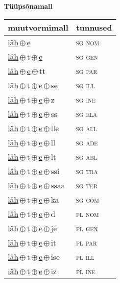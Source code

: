 

\vspace{3.5em}
\noindent \begin{minipage}{\textwidth}
\noindent \textbf{Tüüpsõnamall \,}\\

\begin{sideways}
\begin{tabular}{l l}
muutvormimall & tunnused \\
\hline
\underline{läh}\,$\oplus$\,\underline{e} & \textsc{ sg nom } \\
\underline{läh}\,$\oplus$\,t\,$\oplus$\,\underline{e} & \textsc{ sg gen } \\
\underline{läh}\,$\oplus$\,\underline{e}\,$\oplus$\,tt & \textsc{ sg par } \\
\underline{läh}\,$\oplus$\,t\,$\oplus$\,\underline{e}\,$\oplus$\,se & \textsc{ sg ill } \\
\underline{läh}\,$\oplus$\,t\,$\oplus$\,\underline{e}\,$\oplus$\,z & \textsc{ sg ine } \\
\underline{läh}\,$\oplus$\,t\,$\oplus$\,\underline{e}\,$\oplus$\,ss & \textsc{ sg ela } \\
\underline{läh}\,$\oplus$\,t\,$\oplus$\,\underline{e}\,$\oplus$\,lle & \textsc{ sg all } \\
\underline{läh}\,$\oplus$\,t\,$\oplus$\,\underline{e}\,$\oplus$\,ll & \textsc{ sg ade } \\
\underline{läh}\,$\oplus$\,t\,$\oplus$\,\underline{e}\,$\oplus$\,lt & \textsc{ sg abl } \\
\underline{läh}\,$\oplus$\,t\,$\oplus$\,\underline{e}\,$\oplus$\,ssi & \textsc{ sg tra } \\
\underline{läh}\,$\oplus$\,t\,$\oplus$\,\underline{e}\,$\oplus$\,ssaa & \textsc{ sg ter } \\
\underline{läh}\,$\oplus$\,t\,$\oplus$\,\underline{e}\,$\oplus$\,ka & \textsc{ sg com } \\
\underline{läh}\,$\oplus$\,t\,$\oplus$\,\underline{e}\,$\oplus$\,d & \textsc{ pl nom } \\
\underline{läh}\,$\oplus$\,t\,$\oplus$\,\underline{e}\,$\oplus$\,je & \textsc{ pl gen } \\
\underline{läh}\,$\oplus$\,t\,$\oplus$\,\underline{e}\,$\oplus$\,it & \textsc{ pl par } \\
\underline{läh}\,$\oplus$\,t\,$\oplus$\,\underline{e}\,$\oplus$\,ise & \textsc{ pl ill } \\
\underline{läh}\,$\oplus$\,t\,$\oplus$\,\underline{e}\,$\oplus$\,iz & \textsc{ pl ine } \\

\end{tabular}
\end{sideways}
\end{minipage}
